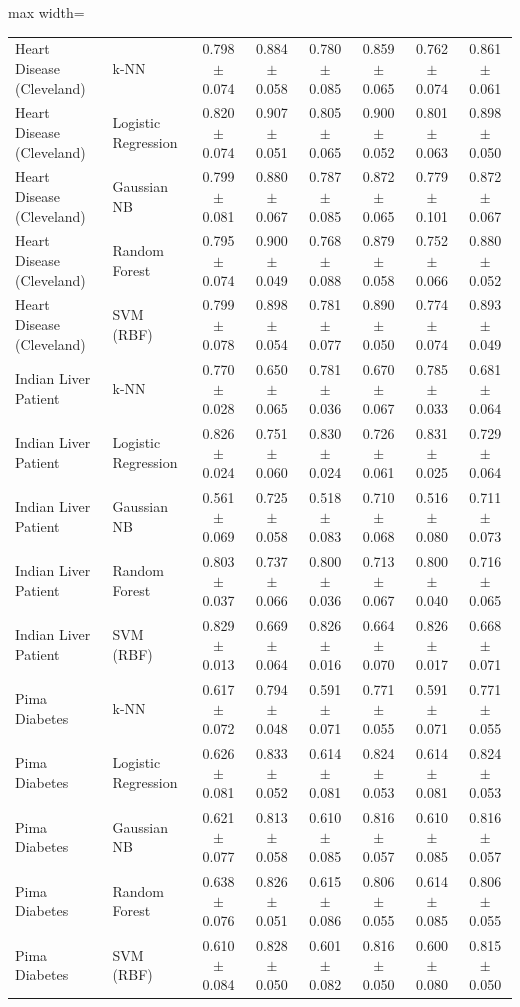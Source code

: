 \begin{table}[!t]
\begin{adjustbox}{max width=\linewidth}
\begin{tabular}{llcccccc}
Heart Disease (Cleveland) & k-NN & 0.798 $\pm$ 0.074 & 0.884 $\pm$ 0.058 & 0.780 $\pm$ 0.085 & 0.859 $\pm$ 0.065 & 0.762 $\pm$ 0.074 & 0.861 $\pm$ 0.061 \\
Heart Disease (Cleveland) & Logistic Regression & 0.820 $\pm$ 0.074 & 0.907 $\pm$ 0.051 & 0.805 $\pm$ 0.065 & 0.900 $\pm$ 0.052 & 0.801 $\pm$ 0.063 & 0.898 $\pm$ 0.050 \\
Heart Disease (Cleveland) & Gaussian NB & 0.799 $\pm$ 0.081 & 0.880 $\pm$ 0.067 & 0.787 $\pm$ 0.085 & 0.872 $\pm$ 0.065 & 0.779 $\pm$ 0.101 & 0.872 $\pm$ 0.067 \\
Heart Disease (Cleveland) & Random Forest & 0.795 $\pm$ 0.074 & 0.900 $\pm$ 0.049 & 0.768 $\pm$ 0.088 & 0.879 $\pm$ 0.058 & 0.752 $\pm$ 0.066 & 0.880 $\pm$ 0.052 \\
Heart Disease (Cleveland) & SVM (RBF) & 0.799 $\pm$ 0.078 & 0.898 $\pm$ 0.054 & 0.781 $\pm$ 0.077 & 0.890 $\pm$ 0.050 & 0.774 $\pm$ 0.074 & 0.893 $\pm$ 0.049 \\
Indian Liver Patient & k-NN & 0.770 $\pm$ 0.028 & 0.650 $\pm$ 0.065 & 0.781 $\pm$ 0.036 & 0.670 $\pm$ 0.067 & 0.785 $\pm$ 0.033 & 0.681 $\pm$ 0.064 \\
Indian Liver Patient & Logistic Regression & 0.826 $\pm$ 0.024 & 0.751 $\pm$ 0.060 & 0.830 $\pm$ 0.024 & 0.726 $\pm$ 0.061 & 0.831 $\pm$ 0.025 & 0.729 $\pm$ 0.064 \\
Indian Liver Patient & Gaussian NB & 0.561 $\pm$ 0.069 & 0.725 $\pm$ 0.058 & 0.518 $\pm$ 0.083 & 0.710 $\pm$ 0.068 & 0.516 $\pm$ 0.080 & 0.711 $\pm$ 0.073 \\
Indian Liver Patient & Random Forest & 0.803 $\pm$ 0.037 & 0.737 $\pm$ 0.066 & 0.800 $\pm$ 0.036 & 0.713 $\pm$ 0.067 & 0.800 $\pm$ 0.040 & 0.716 $\pm$ 0.065 \\
Indian Liver Patient & SVM (RBF) & 0.829 $\pm$ 0.013 & 0.669 $\pm$ 0.064 & 0.826 $\pm$ 0.016 & 0.664 $\pm$ 0.070 & 0.826 $\pm$ 0.017 & 0.668 $\pm$ 0.071 \\
Pima Diabetes & k-NN & 0.617 $\pm$ 0.072 & 0.794 $\pm$ 0.048 & 0.591 $\pm$ 0.071 & 0.771 $\pm$ 0.055 & 0.591 $\pm$ 0.071 & 0.771 $\pm$ 0.055 \\
Pima Diabetes & Logistic Regression & 0.626 $\pm$ 0.081 & 0.833 $\pm$ 0.052 & 0.614 $\pm$ 0.081 & 0.824 $\pm$ 0.053 & 0.614 $\pm$ 0.081 & 0.824 $\pm$ 0.053 \\
Pima Diabetes & Gaussian NB & 0.621 $\pm$ 0.077 & 0.813 $\pm$ 0.058 & 0.610 $\pm$ 0.085 & 0.816 $\pm$ 0.057 & 0.610 $\pm$ 0.085 & 0.816 $\pm$ 0.057 \\
Pima Diabetes & Random Forest & 0.638 $\pm$ 0.076 & 0.826 $\pm$ 0.051 & 0.615 $\pm$ 0.086 & 0.806 $\pm$ 0.055 & 0.614 $\pm$ 0.085 & 0.806 $\pm$ 0.055 \\
Pima Diabetes & SVM (RBF) & 0.610 $\pm$ 0.084 & 0.828 $\pm$ 0.050 & 0.601 $\pm$ 0.082 & 0.816 $\pm$ 0.050 & 0.600 $\pm$ 0.080 & 0.815 $\pm$ 0.050 \\
\bottomrule
\end{tabular}
\end{adjustbox}
\end{table}
